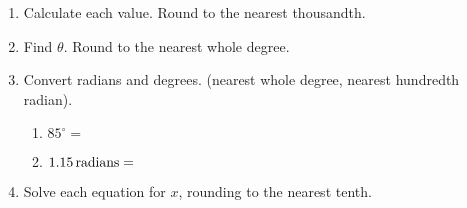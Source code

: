 \documentclass[12pt, twoside]{article}
\begin{document}
\begin{enumerate}
\newpage
\item Calculate each value. Round to the nearest thousandth.
  \begin{enumerate}
  \end{enumerate}
  \vspace{1cm}

\item Find $\theta$. Round to the nearest whole degree.
  \begin{enumerate}
  \end{enumerate} \vspace{2cm}

\item Convert radians and degrees. (nearest whole degree, nearest hundredth radian).\vspace{.25cm}
  \begin{multicols}{2}
    \begin{enumerate}
      \item $85^\circ = $ \vspace{1cm}
      \item $\displaystyle 1.15 \,\rm{radians}=$ \vspace{1cm}
    \end{enumerate}
  \end{multicols} \vspace{2cm}


\item Solve each equation for $x$, rounding to the nearest tenth.
  \begin{enumerate}
  \end{enumerate}
  \vspace{3cm}


\end{enumerate}
\end{document}
